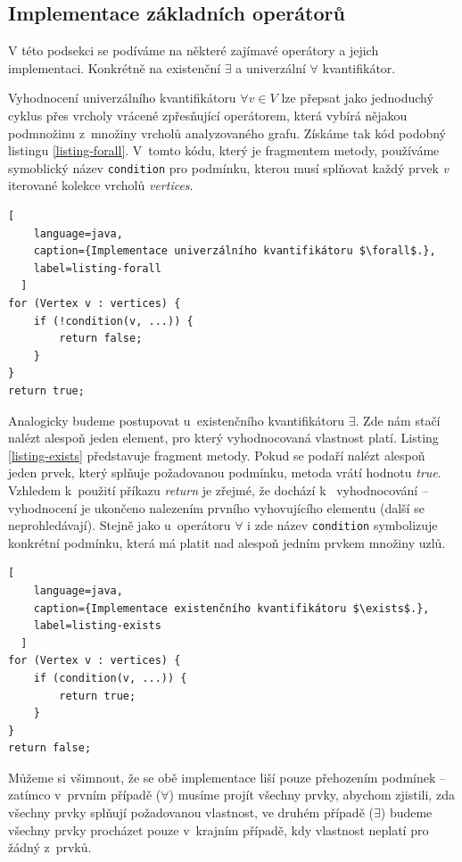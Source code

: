 \subsection{Implementace základních operátorů}
V této podsekci se podíváme na některé zajímavé operátory a jejich implementaci. Konkrétně na existenční $\exists$ a univerzální $\forall$ kvantifikátor.

Vyhodnocení univerzálního kvantifikátoru $\forall v \in V$ lze přepsat jako jednoduchý cyklus přes vrcholy vrácené zpřesňující operátorem, která vybírá nějakou podmnožinu z~množiny vrcholů analyzovaného grafu. Získáme tak kód podobný listingu \ref{listing-forall}. V~tomto kódu, který je fragmentem metody, používáme symoblický název \verb+condition+ pro podmínku, kterou musí splňovat každý prvek \emph{v} iterované kolekce vrcholů \emph{vertices}.

\begin{lstlisting}[
    language=java,
    caption={Implementace univerzálního kvantifikátoru $\forall$.},
    label=listing-forall
  ]
for (Vertex v : vertices) {
    if (!condition(v, ...)) {
        return false;
    }
}
return true;
\end{lstlisting}

Analogicky budeme postupovat u~existenčního kvantifikátoru $\exists$. Zde nám stačí nalézt alespoň jeden element, pro který vyhodnocovaná vlastnost platí. Listing \ref{listing-exists} představuje fragment metody. Pokud se podaří nalézt alespoň jeden prvek, který splňuje požadovanou podmínku, metoda vrátí hodnotu \emph{true}. Vzhledem k~použití příkazu \emph{return} je zřejmé, že dochází k~ vyhodnocování -- vyhodnocení je ukončeno nalezením prvního vyhovujícího elementu (další se neprohledávají). Stejně jako u~operátoru $\forall$ i zde název \verb+condition+ symbolizuje konkrétní podmínku, která má platit nad alespoň jedním prvkem množiny uzlů.

\begin{lstlisting}[
    language=java,
    caption={Implementace existenčního kvantifikátoru $\exists$.},
    label=listing-exists
  ]
for (Vertex v : vertices) {
    if (condition(v, ...)) {
        return true;
    }
}
return false;
\end{lstlisting}

Můžeme si všimnout, že se obě implementace liší pouze přehozením podmínek -- zatímco v~prvním případě ($\forall$) musíme projít všechny prvky, abychom zjistili, zda všechny prvky splňují požadovanou vlastnost, ve druhém případě ($\exists$) budeme všechny prvky procházet pouze v~krajním případě, kdy vlastnost neplatí pro žádný z~prvků.

